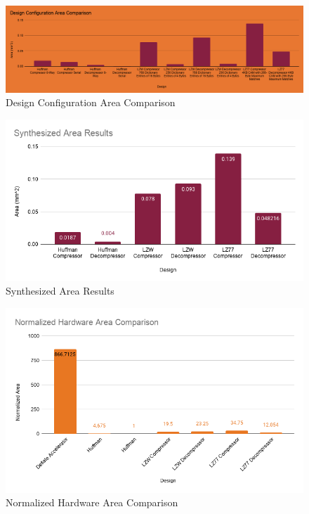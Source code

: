 \documentclass[doublespace,nopageskip]{VTthesis}
\begin{document}
\begin{figure}[htb]
	\centering
	\includegraphics[scale=0.35]{Design Configuration Area Comparison.png}
	\caption{Design Configuration Area Comparison}
	\label{fig:design_configuration_area_comparison}
\end{figure}
\begin{figure}[htb]
	\centering
	\includegraphics[scale=0.6]{Synthesized Area Results.png}
	\caption{Synthesized Area Results}
	\label{fig:synthesized_area_results}
\end{figure}
\begin{figure}[htb]
	\centering
	\includegraphics[scale=0.6]{Normalized Hardware Area Comparison.png}
	\caption{Normalized Hardware Area Comparison}
	\label{fig:normalized_hardware_area_comparison}
\end{figure}
\end{document}
